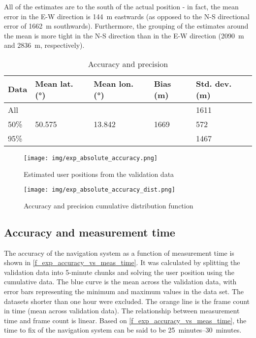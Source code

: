 All of the estimates are to the south of the actual position - in fact, the mean error in the E-W direction is \qty{144}{m} eastwards (as opposed to the N-S directional error of \qty{1662}{m} southwards). Furthermore, the grouping of the estimates around the mean is more tight in the N-S direction than in the E-W direction (\qty{2090}{m} and \qty{2836}{m}, respectively).


\begin{table}
    \centering
    \begin{tabular}{l|llll}
Data & Mean lat. (°) & Mean lon. (°) & Bias (m) & Std. dev. (m)\\ \hline
All  & & &                           & 1611 \\
50\% & 50.575  & 13.842   & 1669     & 572  \\
95\% & & &                           & 1467 \\
    \end{tabular}
    \caption{Accuracy and precision}
    \label{t_exp_accuracy}
\end{table}

\begin{figure}
    \centering
    \texttt{[image: img/exp\_absolute\_accuracy.png]}
    \caption{Estimated user positions from the validation data}
    \label{f_exp_absolute_accuracy}
\end{figure}

\begin{figure}
    \centering
    \texttt{[image: img/exp\_absolute\_accuracy\_dist.png]}
    \caption{Accuracy and precision cumulative distribution function}
    \label{f_exp_absolute_accuracy_dist}
\end{figure}


\subsection{Accuracy and measurement time}
The accuracy of the navigation system as a function of measurement time is shown in \autoref{f_exp_accuracy_vs_meas_time}. It was calculated by splitting the validation data into 5-minute chunks and solving the user position using the cumulative data. The blue curve is the mean across the validation data, with error bars representing the minimum and maximum values in the data set. The datasets shorter than one hour were excluded. The orange line is the frame count in time (mean across validation data). The relationship between measurement time and frame count is linear. Based on \autoref{f_exp_accuracy_vs_meas_time}, the time to fix of the navigation system can be said to be \qtyrange{25}{30}{minutes}.


